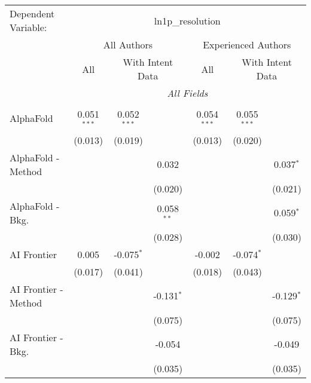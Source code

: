 \begingroup
\centering
\begin{tabular}{lcccccc}
   \tabularnewline \midrule \midrule
   Dependent Variable: & \multicolumn{6}{c}{ln1p\_resolution}\\
 & \multicolumn{3}{c}{All Authors} & \multicolumn{3}{c}{Experienced Authors} \\
\cmidrule(lr){2-4} \cmidrule(lr){5-7}
 & \multicolumn{1}{c}{All} & \multicolumn{2}{c}{With Intent Data} & \multicolumn{1}{c}{All} & \multicolumn{2}{c}{With Intent Data} \\
\cmidrule(lr){2-2} \cmidrule(lr){3-4} \cmidrule(lr){5-5} \cmidrule(lr){6-7}
 & \multicolumn{6}{c}{\textit{All Fields}} \\ \\
   AlphaFold            & 0.051$^{***}$ & 0.052$^{***}$ &              & 0.054$^{***}$ & 0.055$^{***}$ &   \\   
                        & (0.013)       & (0.019)       &              & (0.013)       & (0.020)       &   \\   
   AlphaFold - Method   &               &               & 0.032        &               &               & 0.037$^{*}$\\   
                        &               &               & (0.020)      &               &               & (0.021)\\   
   AlphaFold - Bkg.     &               &               & 0.058$^{**}$ &               &               & 0.059$^{*}$\\   
                        &               &               & (0.028)      &               &               & (0.030)\\   
   AI Frontier          & 0.005         & -0.075$^{*}$  &              & -0.002        & -0.074$^{*}$  &   \\   
                        & (0.017)       & (0.041)       &              & (0.018)       & (0.043)       &   \\   
   AI Frontier - Method &               &               & -0.131$^{*}$ &               &               & -0.129$^{*}$\\   
                        &               &               & (0.075)      &               &               & (0.075)\\   
   AI Frontier - Bkg.   &               &               & -0.054       &               &               & -0.049\\   
                        &               &               & (0.035)      &               &               & (0.035)\\   

\end{tabular}
